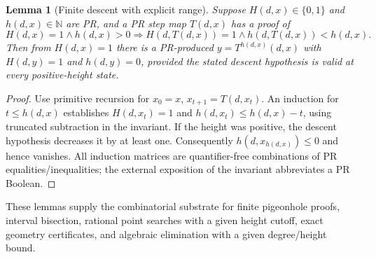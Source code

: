 \documentclass[11pt]{article}
\newtheorem{lemma}[theorem]{Lemma}
\newcommand{\NN}{\mathbb N}\newcommand{\QQ}{\mathbb Q}\newcommand{\PR}{\mathrm{PR}}\newcommand{\iPRA}{\mathrm{iPRA}}\newcommand{\eps}{\varepsilon}
\begin{document}
\begin{lemma}[Finite descent with explicit range]
Suppose $H(d,x)\in\{0,1\}$ and $h(d,x)\in\NN$ are PR, and a PR step map $T(d,x)$ has a proof of
\[H(d,x)=1\land h(d,x)>0\Longrightarrow H(d,T(d,x))=1\land h(d,T(d,x))<h(d,x).\]
Then from $H(d,x)=1$ there is a PR-produced $y=T^{h(d,x)}(d,x)$ with $H(d,y)=1$ and $h(d,y)=0$, provided the stated descent hypothesis is valid at every positive-height state.
\end{lemma}
\begin{proof}
Use primitive recursion for $x_0=x$, $x_{t+1}=T(d,x_t)$. An induction for $t\le h(d,x)$ establishes $H(d,x_t)=1$ and $h(d,x_t)\le h(d,x)-t$, using truncated subtraction in the invariant. If the height was positive, the descent hypothesis decreases it by at least one. Consequently $h(d,x_{h(d,x)})\le0$ and hence vanishes. All induction matrices are quantifier-free combinations of PR equalities/inequalities; the external exposition of the invariant abbreviates a PR Boolean.\end{proof}
These lemmas supply the combinatorial substrate for finite pigeonhole proofs, interval bisection, rational point searches with a given height cutoff, exact geometry certificates, and algebraic elimination with a given degree/height bound.
\end{document}
